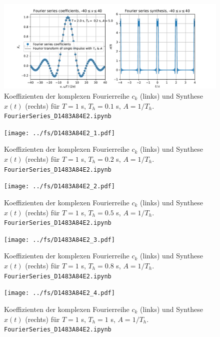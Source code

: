 \begin{figure}
\includegraphics[width=\textwidth]{../fs/D1483A84E2_0.pdf}
\caption{Koeffizienten der komplexen Fourierreihe $c_k$ (links) und Synthese $x(t)$ (rechts) für
$T=1$ s, $T_h=0.1$ s, $A=1/T_h$. \texttt{FourierSeries\_D1483A84E2.ipynb}}
\label{fig:D1483A84E2_0}
\end{figure}

\begin{figure}
\texttt{[image: ../fs/D1483A84E2\_1.pdf]}
\caption{Koeffizienten der komplexen Fourierreihe $c_k$ (links) und Synthese $x(t)$ (rechts) für
$T=1$ s, $T_h=0.2$ s, $A=1/T_h$. \texttt{FourierSeries\_D1483A84E2.ipynb}}
\label{fig:D1483A84E2_1}
\end{figure}

\begin{figure}
\texttt{[image: ../fs/D1483A84E2\_2.pdf]}
\caption{Koeffizienten der komplexen Fourierreihe $c_k$ (links) und Synthese $x(t)$ (rechts) für
$T=1$ s, $T_h=0.5$ s, $A=1/T_h$. \texttt{FourierSeries\_D1483A84E2.ipynb}}
\label{fig:D1483A84E2_2}
\end{figure}

\begin{figure}
\texttt{[image: ../fs/D1483A84E2\_3.pdf]}
\caption{Koeffizienten der komplexen Fourierreihe $c_k$ (links) und Synthese $x(t)$ (rechts) für
$T=1$ s, $T_h=0.8$ s, $A=1/T_h$. \texttt{FourierSeries\_D1483A84E2.ipynb}}
\label{fig:D1483A84E2_3}
\end{figure}

\begin{figure}
\texttt{[image: ../fs/D1483A84E2\_4.pdf]}
\caption{Koeffizienten der komplexen Fourierreihe $c_k$ (links) und Synthese $x(t)$ (rechts) für
$T=1$ s, $T_h=1$ s, $A=1/T_h$. \texttt{FourierSeries\_D1483A84E2.ipynb}}
\label{fig:D1483A84E2_4}
\end{figure}




\newpage
